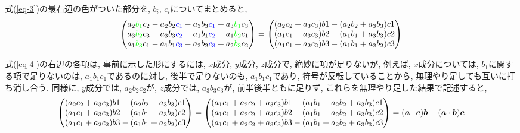 \documentclass{jsarticle}
\newcommand*{\mbold}[1]{\mbox{\boldmath $#1$}}
\begin{document}
式(\ref{eq-3})の最右辺の色がついた部分を, $b_i$, $c_i$についてまとめると, 
\begin{equation}\label{eq-4}
  \begin{pmatrix}
      a_2 \textcolor{green}{b_1} c_2 - a_2 b_2 \textcolor{blue}{c_1} - a_3 b_3 \textcolor{blue}{c_1} + a_3 \textcolor{green}{b_1} c_3 \\
      a_3 \textcolor{green}{b_2} c_3 - a_3 b_3 \textcolor{blue}{c_2} - a_1 b_1 \textcolor{blue}{c_2} + a_1 \textcolor{green}{b_2} c_1 \\
      a_1 \textcolor{green}{b_3} c_1 - a_1 b_1 \textcolor{blue}{c_3} - a_2 b_2 \textcolor{blue}{c_3} + a_2 \textcolor{green}{b_3} c_2
  \end{pmatrix}
  = \begin{pmatrix}
      (a_2 c_2 + a_3 c_3)b1 - (a_2 b_2 + a_3 b_3)c1 \\
      (a_1 c_1 + a_3 c_3)b2 - (a_1 b_1 + a_3 b_3)c2 \\
      (a_1 c_1 + a_2 c_2)b3 - (a_1 b_1 + a_2 b_2)c3 
    \end{pmatrix}
\end{equation}

式(\ref{eq-4})の右辺の各項は, 事前に示した形にするには, $x$成分, $y$成分, $z$成分で, 絶妙に項が足りないが, 例えば, $x$成分については, $b_1$に関する項で足りないのは, $a_1 b_1 c_1$であるのに対し, 後半で足りないのも, $a_1 b_1 c_1$であり, 符号が反転していることから, 無理やり足しても互いに打ち消し合う. 
同様に, $y$成分では, $a_2 b_2 c_2$が, $z$成分では, $a_3 b_3 c_3$が, 前半後半ともに足りず, これらを無理やり足した結果で記述すると, 
\begin{equation}\label{eq-5}
  \begin{pmatrix}
      (a_2 c_2 + a_3 c_3)b1 - (a_2 b_2 + a_3 b_3)c1 \\
      (a_1 c_1 + a_3 c_3)b2 - (a_1 b_1 + a_3 b_3)c2 \\
      (a_1 c_1 + a_2 c_2)b3 - (a_1 b_1 + a_2 b_2)c3 
  \end{pmatrix}
  = \begin{pmatrix}
      (a_1 c_1 + a_2 c_2 + a_3 c_3)b1 - (a_1 b_1 + a_2 b_2 + a_3 b_3)c1 \\
      (a_1 c_1 + a_2 c_2 + a_3 c_3)b2 - (a_1 b_1 + a_2 b_2 + a_3 b_3)c2 \\
      (a_1 c_1 + a_2 c_2 + a_3 c_3)b3 - (a_1 b_1 + a_2 b_2 + a_3 b_3)c3 
    \end{pmatrix}
  = (\mbold{a} \cdot \mbold{c})\mbold{b} - (\mbold{a} \cdot \mbold{b})\mbold{c}
\end{equation}
\end{document}
